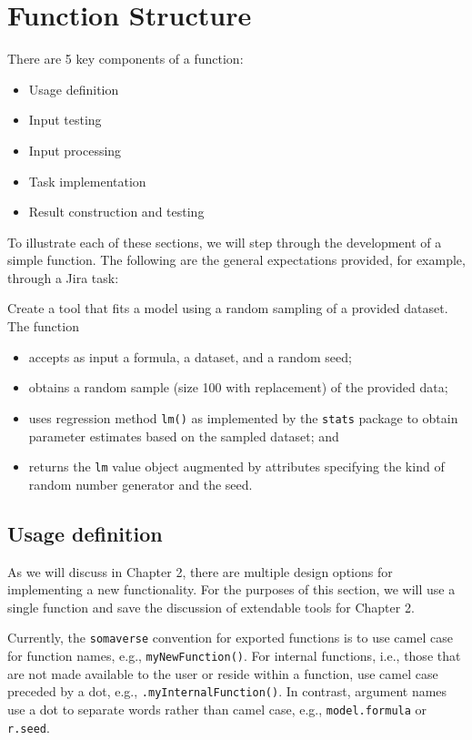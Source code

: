 \documentclass[
]{book}
\providecommand{\tightlist}{%
  \setlength{\itemsep}{0pt}\setlength{\parskip}{0pt}}
\begin{document}
\hypertarget{function-structure}{%
\section{Function Structure}\label{function-structure}}

There are 5 key components of a function:

\begin{itemize}
\tightlist
\item
  Usage definition
\item
  Input testing
\item
  Input processing
\item
  Task implementation
\item
  Result construction and testing
\end{itemize}

To illustrate each of these sections, we will step through the development of a simple function. The following are the general expectations provided, for example, through a Jira task:

Create a tool that fits a model using a random sampling of a provided dataset. The function

\begin{itemize}
\tightlist
\item
  accepts as input a formula, a dataset, and a random seed;
\item
  obtains a random sample (size 100 with replacement) of the provided data;
\item
  uses regression method \texttt{lm()} as implemented by the \texttt{stats} package to obtain parameter estimates based on the sampled dataset; and
\item
  returns the \texttt{lm} value object augmented by attributes specifying the kind of random number generator and the seed.
\end{itemize}

\hypertarget{usage-definition}{%
\subsection{Usage definition}\label{usage-definition}}

As we will discuss in Chapter 2, there are multiple design options for implementing a new functionality. For the purposes of this section, we will use a single function and save the discussion of extendable tools for Chapter 2.

Currently, the \texttt{somaverse} convention for exported functions is to use camel case for function names, e.g., \texttt{myNewFunction()}. For internal functions, i.e., those that are not made available to the user or reside within a function, use camel case preceded by a dot, e.g., \texttt{.myInternalFunction()}. In contrast, argument names use a dot to separate words rather than camel case, e.g., \texttt{model.formula} or \texttt{r.seed}.
\end{document}
